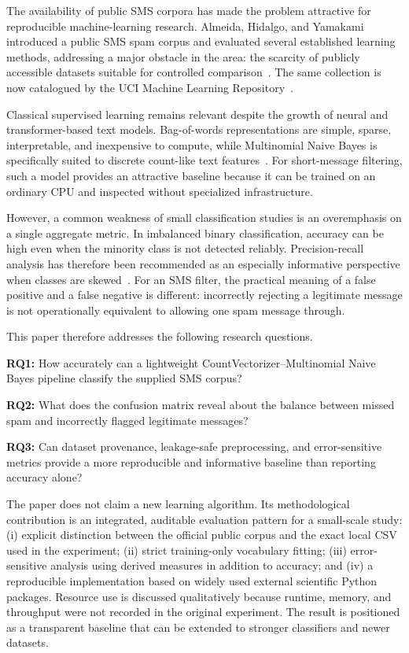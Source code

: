 \documentclass[conference]{IEEEtran}
\begin{document}
The availability of public SMS corpora has made the problem attractive for reproducible machine-learning research. Almeida, Hidalgo, and Yamakami introduced a public SMS spam corpus and evaluated several established learning methods, addressing a major obstacle in the area: the scarcity of publicly accessible datasets suitable for controlled comparison~\cite{almeida2011sms}. The same collection is now catalogued by the UCI Machine Learning Repository~\cite{uci_sms}.

Classical supervised learning remains relevant despite the growth of neural and transformer-based text models. Bag-of-words representations are simple, sparse, interpretable, and inexpensive to compute, while Multinomial Naive Bayes is specifically suited to discrete count-like text features~\cite{mccallum1998nb}. For short-message filtering, such a model provides an attractive baseline because it can be trained on an ordinary CPU and inspected without specialized infrastructure.

However, a common weakness of small classification studies is an overemphasis on a single aggregate metric. In imbalanced binary classification, accuracy can be high even when the minority class is not detected reliably. Precision-recall analysis has therefore been recommended as an especially informative perspective when classes are skewed~\cite{davis2006pr,saito2015pr}. For an SMS filter, the practical meaning of a false positive and a false negative is different: incorrectly rejecting a legitimate message is not operationally equivalent to allowing one spam message through.

This paper therefore addresses the following research questions.

\textbf{RQ1:} How accurately can a lightweight CountVectorizer--Multinomial Naive Bayes pipeline classify the supplied SMS corpus?

\textbf{RQ2:} What does the confusion matrix reveal about the balance between missed spam and incorrectly flagged legitimate messages?

\textbf{RQ3:} Can dataset provenance, leakage-safe preprocessing, and error-sensitive metrics provide a more reproducible and informative baseline than reporting accuracy alone?

The paper does not claim a new learning algorithm. Its methodological contribution is an integrated, auditable evaluation pattern for a small-scale study: (i) explicit distinction between the official public corpus and the exact local CSV used in the experiment; (ii) strict training-only vocabulary fitting; (iii) error-sensitive analysis using derived measures in addition to accuracy; and (iv) a reproducible implementation based on widely used external scientific Python packages. Resource use is discussed qualitatively because runtime, memory, and throughput were not recorded in the original experiment. The result is positioned as a transparent baseline that can be extended to stronger classifiers and newer datasets.
\end{document}
